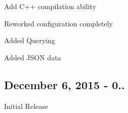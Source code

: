 
\begin{DoxyItemize}
\item Add C++ compilation ability
\item Reworked configuration completely
\item Added Querying
\item Added J\+S\+O\+N data
\end{DoxyItemize}

\subsection*{December 6, 2015 -\/ 0..}

Initial Release 